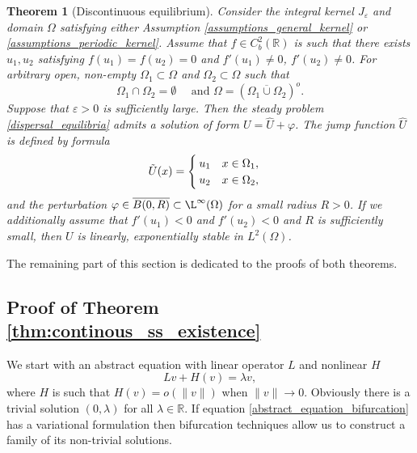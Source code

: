 \documentclass[12pt, a4paper]{article}
\theoremstyle{break}
\newtheorem{thm}{Theorem}[section]
\theoremstyle{break}
\theoremstyle{break}
\theoremstyle{break}
\theoremstyle{break}
\begin{document}
\begin{thm}[Discontinuous equilibrium]
    Consider the integral kernel $J_\varepsilon$ and domain $\Omega$ satisfying either Assumption \ref{assumptions_general_kernel} or \ref{assumptions_periodic_kernel}. Assume that $f \in C^2_b(\mathbb{R})$ is such that there exists $u_1, u_2$ satisfying $f(u_1) = f(u_2) = 0$ and $f'(u_1) \neq 0$, $f'(u_2) \neq 0$. For arbitrary open, non-empty $\Omega_1 \subset \Omega$ and $\Omega_2 \subset \Omega$ such that
    \begin{equation}
        \Omega_1 \cap \Omega_2 = \emptyset \quad \text{ and } \Omega = \left(\overline{\Omega_1 \cup \Omega_2}\right)^o. \label{omega_partition}
    \end{equation}
    Suppose that $\varepsilon > 0$ is sufficiently large. Then the steady problem \eqref{dispersal_equilibria} admits a solution of form $U = \hat{U} + \varphi$. The jump function $\hat{U}$ is defined by formula
    \begin{equation}
        \Tilde{U}(x) = \begin{cases}
            u_1 \quad x \in \Omega_1, \\
            u_2 \quad x \in \Omega_2,
        \end{cases}
        \label{jump_function}
    \end{equation}
    and the perturbation $\varphi \in \overline{B(0, R)} \subset \L^\infty(\Omega)$ for a small radius $R > 0$. If we additionally assume that $f'(u_1) < 0$ and $f'(u_2) < 0$ and $R$ is sufficiently small, then $U$ is linearly, exponentially stable in $L^2(\Omega)$.
    \label{thm:discontinous_ss}
\end{thm}

The remaining part of this section is dedicated to the proofs of both theorems.

\subsection{Proof of Theorem \ref{thm:continous_ss_existence}}

We start with an abstract equation with linear operator $L$ and nonlinear $H$
\begin{equation}
    L v + H(v) = \lambda v,
    \label{abstract_equation_bifurcation}
\end{equation}
where $H$ is such that $H(v) = o(\|v\|)$ when $\|v\| \rightarrow 0$. Obviously there is a trivial solution $(0, \lambda)$ for all $\lambda \in \mathbb{R}$. If equation \eqref{abstract_equation_bifurcation} has a variational formulation then bifurcation techniques allow us to construct a family of its non-trivial solutions.
\end{document}

